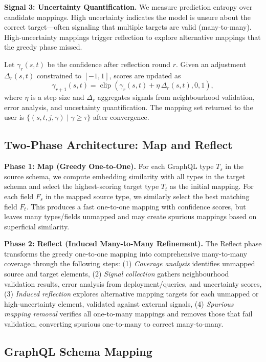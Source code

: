 \documentclass[sigconf, nonacm]{acmart}
\begin{document}
\textbf{Signal 3: Uncertainty Quantification.} We measure prediction entropy over candidate mappings. High uncertainty indicates the model is unsure about the correct target—often signaling that multiple targets are valid (many-to-many). High-uncertainty mappings trigger reflection to explore alternative mappings that the greedy phase missed.

Let $\gamma_r(s,t)$ be the confidence after reflection round $r$. Given an adjustment $\Delta_r(s,t)$ constrained to $[-1,1]$, scores are updated as
\[
\gamma_{r+1}(s,t)=\operatorname{clip}(\gamma_r(s,t)+\eta\,\Delta_r(s,t),0,1),
\]
where $\eta$ is a step size and $\Delta_r$ aggregates signals from neighbourhood validation, error analysis, and uncertainty quantification. The mapping set returned to the user is $\{(s,t,j,\gamma)\mid\gamma\ge\tau\}$ after convergence.

\subsection{Two-Phase Architecture: Map and Reflect}

\textbf{Phase 1: Map (Greedy One-to-One).} For each GraphQL type $T_s$ in the source schema, we compute embedding similarity with all types in the target schema and select the highest-scoring target type $T_t$ as the initial mapping. For each field $F_s$ in the mapped source type, we similarly select the best matching field $F_t$. This produces a fast one-to-one mapping with confidence scores, but leaves many types/fields unmapped and may create spurious mappings based on superficial similarity.

\textbf{Phase 2: Reflect (Induced Many-to-Many Refinement).} The Reflect phase transforms the greedy one-to-one mapping into comprehensive many-to-many coverage through the following steps: (1) \emph{Coverage analysis} identifies unmapped source and target elements, (2) \emph{Signal collection} gathers neighbourhood validation results, error analysis from deployment/queries, and uncertainty scores, (3) \emph{Induced reflection} explores alternative mapping targets for each unmapped or high-uncertainty element, validated against external signals, (4) \emph{Spurious mapping removal} verifies all one-to-many mappings and removes those that fail validation, converting spurious one-to-many to correct many-to-many.

\subsection{GraphQL Schema Mapping}
\end{document}
